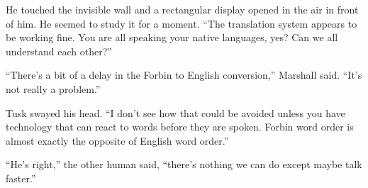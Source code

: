 He touched the invisible wall and a rectangular display opened in the air in front of him. He
seemed to study it for a moment. ``The translation system appears to be working fine. You are
all speaking your native languages, yes? Can we all understand each other?''

``There's a bit of a delay in the Forbin to English conversion,'' Marshall said. ``It's not
really a problem.''

Tusk swayed his head. ``I don't see how that could be avoided unless you have technology that
can react to words before they are spoken. Forbin word order is almost exactly the opposite of
English word order.''

``He's right,'' the other human said, ``there's nothing we can do except maybe talk faster.''



